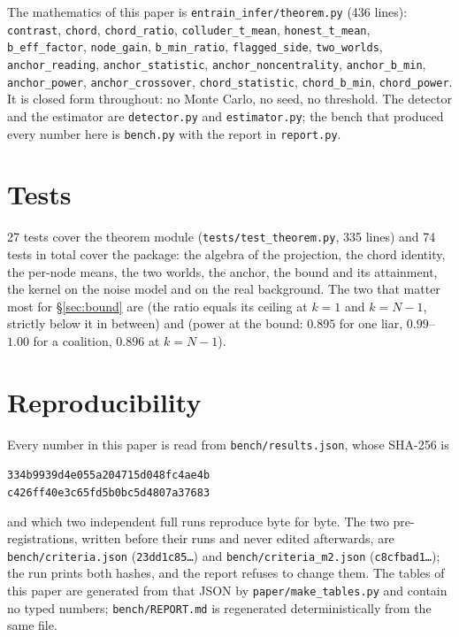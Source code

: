 \documentclass[10pt,twocolumn,a4paper]{article}
\theoremstyle{definition}
\theoremstyle{remark}
\begin{document}
The mathematics of this paper is \texttt{entrain\_infer/theorem.py} (436 lines):
\texttt{contrast}, \texttt{chord}, \texttt{chord\_ratio},
\texttt{colluder\_t\_mean}, \texttt{honest\_t\_mean}, \texttt{b\_eff\_factor},
\texttt{node\_gain}, \texttt{b\_min\_ratio}, \texttt{flagged\_side},
\texttt{two\_worlds}, \texttt{anchor\_reading}, \texttt{anchor\_statistic},
\texttt{anchor\_noncentrality}, \texttt{anchor\_b\_min}, \texttt{anchor\_power},
\texttt{anchor\_crossover}, \texttt{chord\_statistic}, \texttt{chord\_b\_min},
\texttt{chord\_power}. It is closed form throughout: no Monte Carlo, no seed, no
threshold. The detector and the estimator are \texttt{detector.py} and
\texttt{estimator.py}; the bench that produced every number here is
\texttt{bench.py} with the report in \texttt{report.py}.

\section{Tests}
\label{app:tests}

27 tests cover the theorem module (\texttt{tests/test\_theorem.py}, 335 lines) and
74 tests in total cover the package: the algebra of the projection, the chord
identity, the per-node means, the two worlds, the anchor, the bound and its
attainment, the kernel on the noise model and on the real background. The two that
matter most for \S\ref{sec:bound} are
 (the ratio equals its ceiling
at $k=1$ and $k=N-1$, strictly below it in between) and
 (power at the
bound: $0.895$ for one liar, $0.99$--$1.00$ for a coalition, $0.896$ at $k=N-1$).


\section{Reproducibility}
\label{app:repro}

Every number in this paper is read from \texttt{bench/results.json}, whose SHA-256
is
\begin{center}
\texttt{334b9939d4e055a204715d048fc4ae4b}\\
\texttt{c426ff40e3c65fd5b0bc5d4807a37683}
\end{center}
and which two independent full runs reproduce byte for byte. The two
pre-registrations, written before their runs and never edited afterwards, are
\texttt{bench/criteria.json} (\texttt{23dd1c85\ldots}) and
\texttt{bench/criteria\_m2.json} (\texttt{c8cfbad1\ldots}); the run prints both
hashes, and the report refuses to change them. The tables of this paper are
generated from that JSON by \texttt{paper/make\_tables.py} and contain no typed
numbers; \texttt{bench/REPORT.md} is regenerated deterministically from the same
file.
\end{document}

